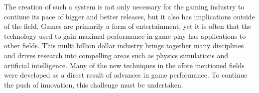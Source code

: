 \documentclass[11pt]{article}
\begin{document}
The creation of such a system is not only necessary for the gaming industry to continue its pace of bigger and better releases, but it also has implications outside of the field. Games are primarily a form of entertainment, yet it is often that the technology used to gain maximal performance in game play has applications to other fields. This multi billion dollar industry brings together many disciplines and drives research into compelling areas such as physics simulations and artificial intelligence. Many of the new techniques in the afore mentioned fields were developed as a direct result of advances in game performance. To continue the push of innovation, this challenge must be undertaken. 



\end{document}
